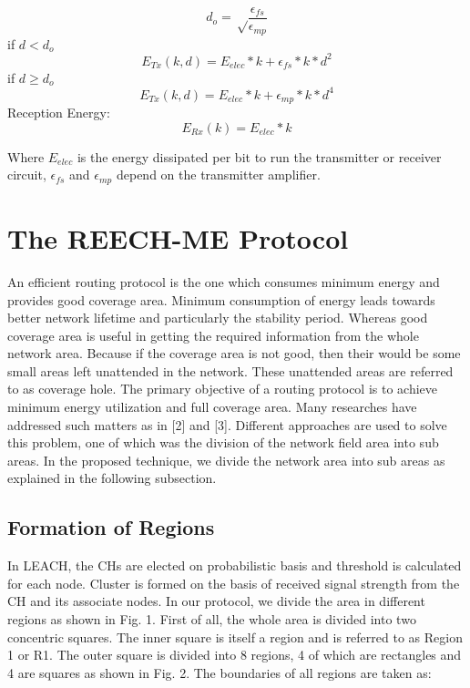 \documentclass[journal]{IEEEtran}
\begin{document}
\begin{equation}
  d_{o}=\sqrt\frac{\epsilon_{fs}}{\epsilon_{mp}}
\end{equation}
if $d<d_{o}$
\begin{equation}
  E_{Tx}(k,d)=E_{elec} * k + \epsilon_{fs}*k*d^2
\end{equation}
if $d \geq d_{o}$
\begin{equation}
  E_{Tx}(k,d)=E_{elec} * k + \epsilon_{mp}*k*d^4
\end{equation}
 Reception Energy:
\begin{equation}
  E_{Rx}(k)=E_{elec} * k
\end{equation}

Where $E_{elec}$ is the energy dissipated per bit to run the transmitter or receiver circuit, $\epsilon_{fs}$ and $\epsilon_{mp}$ depend on the transmitter amplifier.

\section{The REECH-ME Protocol}
An efficient routing protocol is the one which consumes minimum energy and provides good coverage area. Minimum consumption of energy leads towards better network lifetime and particularly the stability period. Whereas good coverage area is useful in getting the required information from the whole network area. Because if the coverage area is not good, then their would be some small areas left unattended in the network. These unattended areas are referred to as coverage hole. The primary objective of a routing protocol is to achieve minimum energy utilization and full coverage area. Many researches have addressed such matters as in [2] and [3]. Different approaches are used to solve this problem, one of which was the division of the network field area into sub areas. In the proposed technique, we divide the network area into sub areas as explained in the following subsection.

\subsection{Formation of Regions}
In LEACH, the CHs are elected on probabilistic basis and threshold is calculated for each node. Cluster is formed on the basis of received signal strength from the CH and its associate nodes. In our protocol, we divide the area in different regions as shown in Fig. 1. First of all, the whole area is divided into two concentric squares. The inner square is itself a region and is referred to as Region 1 or R1. The outer square is divided into 8 regions, 4 of which are rectangles and 4 are squares as shown in Fig. 2. The boundaries of all regions are taken as:
\end{document}
